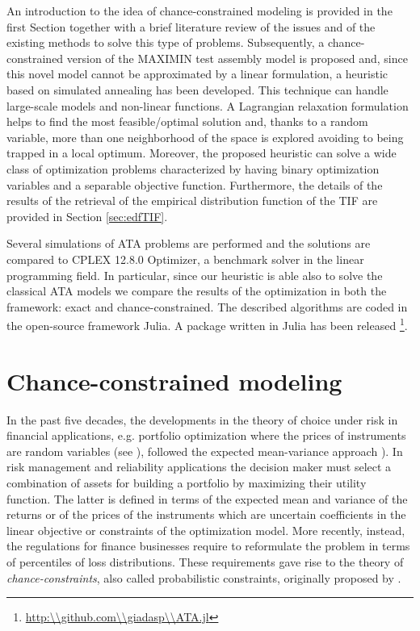 An introduction to the idea of chance-constrained modeling is provided in the first Section together with a brief literature review of the issues and of the existing methods to solve this type of problems.
Subsequently, a chance-constrained version of the MAXIMIN test assembly model is proposed and, since this novel model cannot be approximated by a linear formulation, a heuristic based on simulated annealing \parencite{goffe1996simann} has been developed.
This technique can handle large-scale models and non-linear functions.
A Lagrangian relaxation formulation helps to find the most feasible/optimal solution and, thanks to a random variable, more than one neighborhood of the space is explored avoiding to being trapped in a local optimum.
Moreover, the proposed heuristic can solve a wide class of optimization problems characterized by having binary optimization variables and a separable objective function.
Furthermore, the details of the results of the retrieval of the empirical distribution function of the TIF are provided in Section \ref{sec:edfTIF}.

Several simulations of ATA problems are performed and the solutions are compared to CPLEX 12.8.0 Optimizer, a benchmark solver in the linear programming field. 
In particular, since our heuristic is able also to solve the classical ATA models we compare the results of the optimization in both the framework: exact and chance-constrained.
The described algorithms are coded in the open-source framework Julia.
A package written in Julia has been released \footnote{\url{http:\\github.com\\giadasp\\ATA.jl}}.

\section{Chance-constrained modeling}

In the past five decades, the developments in the theory of choice under risk in financial applications, e.g. portfolio optimization where the prices of instruments are random variables (see \textcite{rockafellar2000optimization,rockafellar2001uryasev}),  followed the expected mean-variance approach \parencite{chen1973quadratic,freund1956introduction,scott1972practical}). In risk management and reliability applications the decision maker must select a combination of assets for building a portfolio by maximizing their utility function. The latter is defined in terms of the expected mean and variance of the returns or of the prices of the instruments which are uncertain coefficients in the linear objective or constraints of the optimization model. More recently, instead, the regulations for finance businesses require to reformulate the problem in terms of percentiles of loss distributions. These requirements gave rise to the theory of \emph{chance-constraints}, also called probabilistic constraints, originally proposed by \textcite{Charnes1959}. 

